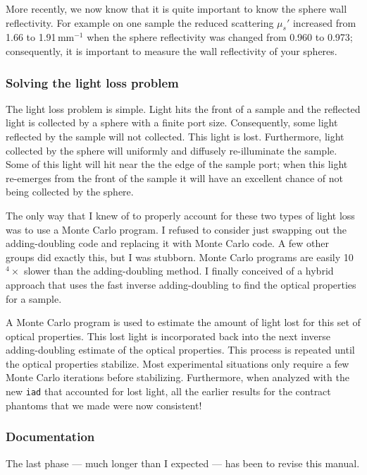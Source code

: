 \documentclass{article}
\newcommand\iadprog{\texttt{iad}}
\begin{document}
More recently, we now know that it is quite important to know the sphere
wall reflectivity.  For example on one sample the reduced scattering $\mu_s'$
increased from 1.66 to 1.91\,mm$^{-1}$ when the sphere reflectivity was 
changed from 0.960 to 0.973; consequently, it is important to measure
the wall reflectivity of your spheres.

\subsubsection*{Solving the light loss problem}

The light loss problem is simple.  Light hits the front of a sample and the
reflected light is collected by a sphere with a finite port size.  Consequently,
some light reflected by the sample will not collected.  This light is lost.
Furthermore, light collected by the sphere will uniformly and diffusely 
re-illuminate the sample.  Some of this light will hit near the
the edge of the sample port; when this light re-emerges from the front of
the sample it will have an excellent chance of not being collected by the sphere.

The only way that I knew of to properly account for these two types of light
loss was to use a Monte Carlo program.  I refused to consider just swapping
out the adding-doubling code and replacing it with Monte Carlo code.
A few other groups did exactly this, but I was stubborn.
Monte Carlo programs are easily 10$^4\times$
slower than the adding-doubling method.  I finally conceived of a hybrid 
approach that uses the fast inverse adding-doubling to find the optical properties
for a sample.  

A Monte Carlo program is used to estimate the amount of light
lost for this set of optical properties.  This lost light is incorporated 
back into the next inverse adding-doubling estimate of the optical
properties.  This process is repeated until the optical properties
stabilize.  Most experimental situations only require
a few Monte Carlo iterations before stabilizing.  Furthermore, when analyzed
with the new \iadprog{} that accounted for lost light, all the earlier 
results for the contract phantoms that we made were now consistent!

\subsubsection*{Documentation}
The last phase --- much longer than I expected --- has been to revise
this manual.  
\end{document}
